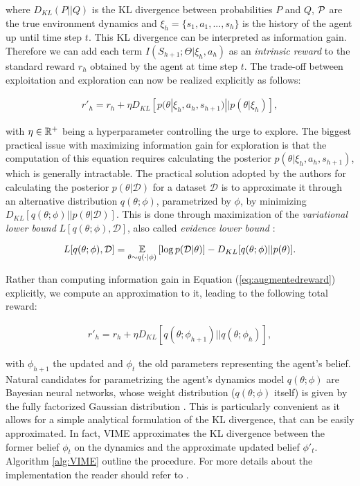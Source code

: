 where $D_{KL}(P||Q)$ is the \gls{KL} divergence between probabilities $P$ and $Q$, $\mathcal{P}$ are the true environment dynamics and $\xi_h=\{s_1,a_1,...,s_h\}$ is the history of the agent up until time step $t$. This \gls{KL} divergence can be interpreted as information gain. Therefore we can add each term $I(S_{h+1};\Theta|\xi_h,a_h)$ as an \emph{intrinsic reward} to the standard reward $r_h$ obtained by the agent at time step $t$. The trade-off between exploitation and
exploration can now be realized explicitly as follows:

\begin{align}
r'_h = r_h + \eta D_{KL}[p(\theta|\xi_h,a_h,s_{h+1})||p(\theta|\xi_h)], \label{eq:augmentedreward}
\end{align}
 
with $\eta\in\mathbb{R}^+$ being a hyperparameter controlling the urge to explore. The biggest practical
issue with maximizing information gain for exploration is that the computation of this equation requires calculating the posterior $p(\theta|\xi_h,a_h,s_{h+1})$, which is generally intractable. The practical solution adopted by the authors for calculating the posterior $p(\theta|\mathcal{D})$ for a dataset $\mathcal{D}$ is to approximate it through an alternative distribution $q(\theta;\phi)$, parametrized by $\phi$, by minimizing $D_{KL}[q(\theta;\phi)||p(\theta|\mathcal{D})]$. This is done through maximization of the \emph{variational lower bound} $L[q(\theta;\phi),\mathcal{D}]$, also called \emph{evidence lower bound} \cite{blei2017variational}:

\begin{align}
L[q(\theta;\phi),\mathcal{D}] = \underset{\theta\sim q(\cdot|\phi)}{\mathbb{E}}\left[{\log p(\mathcal{D}|\theta)}\right]-D_{KL}[q(\theta;\phi)||p(\theta)]. \label{eq:elb}
\end{align}

Rather than computing information gain in Equation (\ref{eq:augmentedreward}) explicitly, we compute an approximation to it, leading to the following total reward:

\begin{align}
r'_h = r_h + \eta D_{KL}[q(\theta;\phi_{h+1})||q(\theta;\phi_h)],
\end{align}

with $\phi_{h+1}$ the updated and $\phi_{t}$ the old parameters representing the agent’s belief. Natural candidates for parametrizing the agent’s dynamics model $q(\theta;\phi)$ are Bayesian neural networks, whose weight distribution ($q(\theta;\phi)$ itself) is given by the fully factorized Gaussian distribution \cite{blundell2015weight}. This is particularly convenient as it allows for a simple analytical formulation of the KL divergence, that can be easily approximated. In fact, \gls{VIME} approximates the KL divergence between the former belief $\phi_{t}$ on the dynamics and the approximate updated belief $\phi'_{t}$. Algorithm \ref{alg:VIME} outline the procedure. For more details about the implementation the reader should refer to \cite{houthooft2016vime}. 

